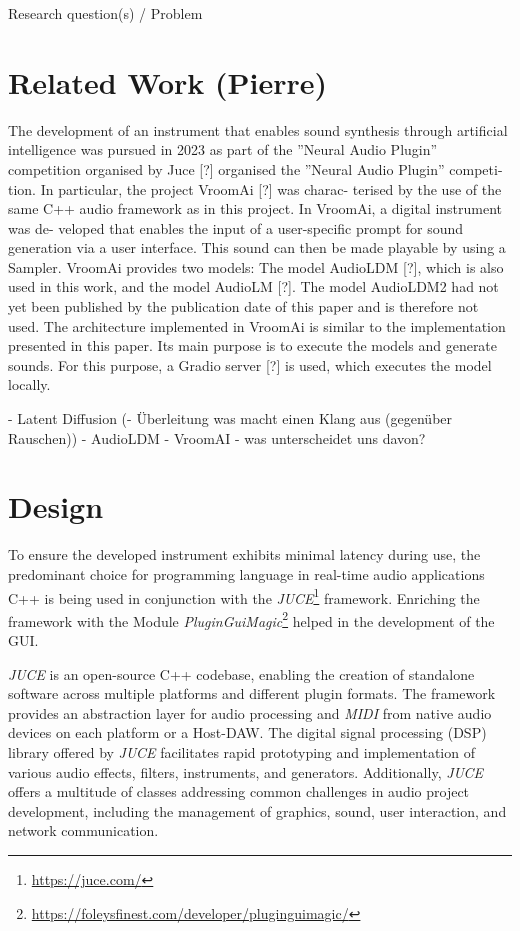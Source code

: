 \documentclass{nime-alternate} %
\begin{document}
Research question(s) / Problem

\section{Related Work (Pierre)}
The development of an instrument that enables sound synthesis through artificial intelligence was pursued in 2023 as part of the ”Neural Audio Plugin” competition organised by Juce [?] organised the ”Neural Audio Plugin” competi-
tion. In particular, the project VroomAi [?] was charac-
terised by the use of the same C++ audio framework as
in this project. In VroomAi, a digital instrument was de-
veloped that enables the input of a user-specific prompt for
sound generation via a user interface. This sound can then
be made playable by using a Sampler.
VroomAi provides two models: The model AudioLDM
[?], which is also used in this work, and the model AudioLM
[?]. The model AudioLDM2 had not yet been published by
the publication date of this paper and is therefore not used.
The architecture implemented in VroomAi is similar to the
implementation presented in this paper. Its main purpose
is to execute the models and generate sounds. For this
purpose, a Gradio server [?] is used, which executes the
model locally.

- Latent Diffusion 
(- Überleitung was macht einen Klang aus (gegenüber Rauschen))
- AudioLDM
- VroomAI - was unterscheidet uns davon?

\section{Design}
To ensure the developed instrument exhibits minimal latency during use, the predominant choice for programming language in real-time audio applications C++ \cite{doumler_c_2015, boulanger_audio_2011} is being used in conjunction with the \emph{JUCE}\footnote{\url{https://juce.com/}} framework. Enriching the framework with the Module \emph{PluginGuiMagic}\footnote{\url{https://foleysfinest.com/developer/pluginguimagic/}} helped in the development of the GUI. 
\newline

\emph{JUCE} is an open-source C++ codebase, enabling the creation of standalone software across multiple platforms and different plugin formats. The framework provides an abstraction layer for audio processing and \emph{MIDI} from native audio devices on each platform or a Host-DAW. The digital signal processing (DSP) library offered by \emph{JUCE} facilitates rapid prototyping and implementation of various audio effects, filters, instruments, and generators. Additionally, \emph{JUCE} offers a multitude of classes addressing common challenges in audio project development, including the management of graphics, sound, user interaction, and network communication. \cite{juce, robinson_getting_2013}
\newline
\end{document}
